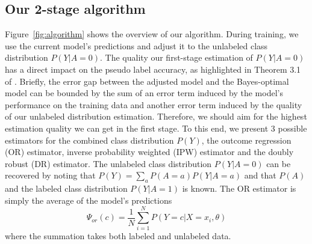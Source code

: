 \subsection{Our 2-stage algorithm}
\label{subsec:2-stage}

Figure~\ref{fig:algorithm} shows the overview of our algorithm. During training, we use the current model's predictions and adjust it to the unlabeled class distribution $P(Y|A=0)$. The quality our first-stage estimation of $P(Y|A=0)$ has a direct impact on the pseudo label accuracy, as highlighted in Theorem 3.1 of \cite{lsc}. Briefly, the error gap between the adjusted model and the Bayes-optimal model can be bounded by the sum of an error term induced by the model's performance on the training data and another error term induced by the quality of our unlabeled distribution estimation. Therefore, we should aim for the highest estimation quality we can get in the first stage. To this end, we present 3 possible estimators for the combined class distribution $P(Y)$, the outcome regression (OR) estimator, inverse probability weighted (IPW) estimator and the doubly robust (DR) estimator. The unlabeled class distribution $P(Y|A=0)$ can be recovered by noting that $P(Y) = \sum_a P(A=a) P(Y|A=a)$ and that $P(A)$ and the labeled class distribution $P(Y|A=1)$ is known. The OR estimator is simply the average of the model's predictions
\begin{equation}
\Psi_{or}(c) = \frac{1}{N}\sum_{i=1}^N P(Y=c|X=x_i,\theta)
\end{equation}
where the summation takes both labeled and unlabeled data. 

